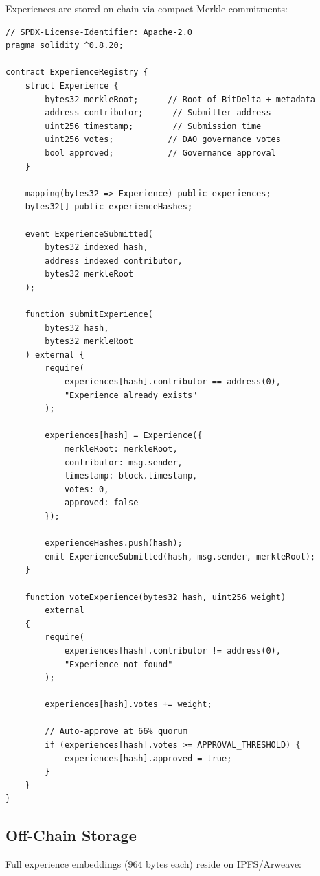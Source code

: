 Experiences are stored on-chain via compact Merkle commitments:

\begin{lstlisting}[language=Solidity, caption=ExperienceRegistry smart contract]
// SPDX-License-Identifier: Apache-2.0
pragma solidity ^0.8.20;

contract ExperienceRegistry {
    struct Experience {
        bytes32 merkleRoot;      // Root of BitDelta + metadata
        address contributor;      // Submitter address
        uint256 timestamp;        // Submission time
        uint256 votes;           // DAO governance votes
        bool approved;           // Governance approval
    }
    
    mapping(bytes32 => Experience) public experiences;
    bytes32[] public experienceHashes;
    
    event ExperienceSubmitted(
        bytes32 indexed hash,
        address indexed contributor,
        bytes32 merkleRoot
    );
    
    function submitExperience(
        bytes32 hash,
        bytes32 merkleRoot
    ) external {
        require(
            experiences[hash].contributor == address(0),
            "Experience already exists"
        );
        
        experiences[hash] = Experience({
            merkleRoot: merkleRoot,
            contributor: msg.sender,
            timestamp: block.timestamp,
            votes: 0,
            approved: false
        });
        
        experienceHashes.push(hash);
        emit ExperienceSubmitted(hash, msg.sender, merkleRoot);
    }
    
    function voteExperience(bytes32 hash, uint256 weight) 
        external 
    {
        require(
            experiences[hash].contributor != address(0),
            "Experience not found"
        );
        
        experiences[hash].votes += weight;
        
        // Auto-approve at 66% quorum
        if (experiences[hash].votes >= APPROVAL_THRESHOLD) {
            experiences[hash].approved = true;
        }
    }
}
\end{lstlisting}

\subsection{Off-Chain Storage}

Full experience embeddings (964 bytes each) reside on IPFS/Arweave:

